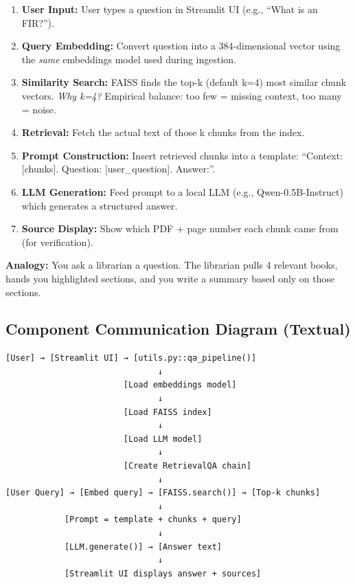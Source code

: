 \documentclass[11pt,a4paper]{article}
\begin{document}
\begin{enumerate}
\item \textbf{User Input:} User types a question in Streamlit UI (e.g., ``What is an FIR?'').
\item \textbf{Query Embedding:} Convert question into a 384-dimensional vector using the \textit{same} embeddings model used during ingestion.
\item \textbf{Similarity Search:} FAISS finds the top-k (default k=4) most similar chunk vectors. \textit{Why k=4?} Empirical balance: too few = missing context, too many = noise.
\item \textbf{Retrieval:} Fetch the actual text of those k chunks from the index.
\item \textbf{Prompt Construction:} Insert retrieved chunks into a template: ``Context: [chunks]. Question: [user\_question]. Answer:''.
\item \textbf{LLM Generation:} Feed prompt to a local LLM (e.g., Qwen-0.5B-Instruct) which generates a structured answer.
\item \textbf{Source Display:} Show which PDF + page number each chunk came from (for verification).
\end{enumerate}

\textbf{Analogy:} You ask a librarian a question. The librarian pulls 4 relevant books, hands you highlighted sections, and you write a summary based only on those sections.

\subsection{Component Communication Diagram (Textual)}

\begin{verbatim}
[User] → [Streamlit UI] → [utils.py::qa_pipeline()]
                               ↓
                        [Load embeddings model]
                               ↓
                        [Load FAISS index]
                               ↓
                        [Load LLM model]
                               ↓
                        [Create RetrievalQA chain]
                               ↓
[User Query] → [Embed query] → [FAISS.search()] → [Top-k chunks]
                               ↓
            [Prompt = template + chunks + query]
                               ↓
            [LLM.generate()] → [Answer text]
                               ↓
            [Streamlit UI displays answer + sources]
\end{verbatim}
\end{document}
